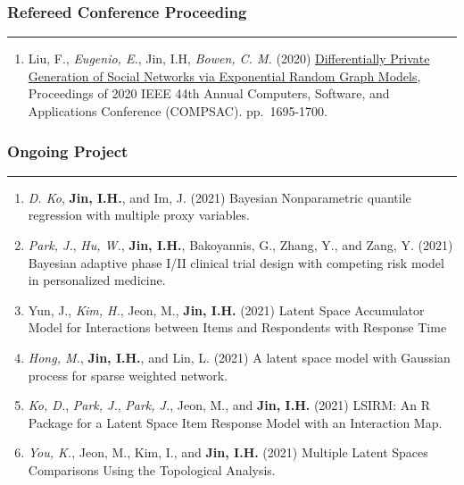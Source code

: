 \documentclass[]{book}
\providecommand{\tightlist}{%
  \setlength{\itemsep}{0pt}\setlength{\parskip}{0pt}}
\begin{document}
\hypertarget{refereed-conference-proceeding}{%
\subsubsection*{Refereed Conference Proceeding}\label{refereed-conference-proceeding}}

\begin{center}\rule{0.5\linewidth}{0.5pt}\end{center}

\begin{enumerate}
\def\labelenumi{\arabic{enumi}.}
\tightlist
\item
  Liu, F., \emph{Eugenio, E.}, Jin, I.H, \emph{Bowen, C. M.} (2020) \href{https://www.researchgate.net/publication/345376724_Differentially_Private_Generation_of_Social_Networks_via_Exponential_Random_Graph_Models}{Differentially Private Generation of Social Networks via Exponential Random Graph Models}, Proceedings of 2020 IEEE 44th Annual Computers, Software, and Applications Conference (COMPSAC). pp.~1695-1700.
\end{enumerate}

\hypertarget{ongoing-project}{%
\subsubsection*{Ongoing Project}\label{ongoing-project}}

\begin{center}\rule{0.5\linewidth}{0.5pt}\end{center}

\begin{enumerate}
\def\labelenumi{\arabic{enumi}.}
\item
  \emph{D. Ko}, \textbf{Jin, I.H.}, and Im, J. (2021) Bayesian Nonparametric quantile regression with multiple proxy variables.
\item
  \emph{Park, J.}, \emph{Hu, W.}, \textbf{Jin, I.H.}, Bakoyannis, G., Zhang, Y., and Zang, Y. (2021) Bayesian adaptive phase I/II clinical trial design with competing risk model in personalized medicine.
\item
  Yun, J., \emph{Kim, H.}, Jeon, M., \textbf{Jin, I.H.} (2021) Latent Space Accumulator Model for Interactions between Items and Respondents with Response Time
\item
  \emph{Hong, M.}, \textbf{Jin, I.H.}, and Lin, L. (2021) A latent space model with Gaussian process for sparse weighted network.
\item
  \emph{Ko, D.}, \emph{Park, J.}, \emph{Park, J.}, Jeon, M., and \textbf{Jin, I.H.} (2021) LSIRM: An R Package for a Latent Space Item Response Model with an Interaction Map.
\item
  \emph{You, K.}, Jeon, M., Kim, I., and \textbf{Jin, I.H.} (2021) Multiple Latent Spaces Comparisons Using the Topological Analysis.
\end{enumerate}
\end{document}
